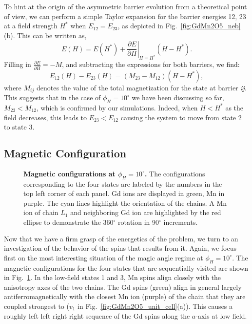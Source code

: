 \\\\
%
To hint at the origin of the asymmetric barrier evolution from a theoretical point of view, we can perform a simple Taylor expansion for the barrier energies 12, 23 at a field strength $H^*$ when $E_{12} = E_{23}$, as depicted in Fig.~\ref{fig:GdMn2O5_neb}(b).
This can be written as,
\begin{equation}
	E(H) = E(H^*) + \left.\frac{\partial E}{\partial H}\right|_{H=H^*}(H - H^*).
\end{equation}
Filling in $\frac{\partial E}{\partial H} = -M$, and subtracting the expressions for both barriers, we find:
\begin{equation}
	E_{12}(H) - E_{23}(H) = (M_{23} - M_{12})(H - H^*),
\end{equation}
where $M_{ij}$ denotes the value of the total magnetization for the state at barrier {\it ij}.
This suggests that in the case of $\phi_H=10^\circ$ we have been discussing so far, $M_{23} < M_{12}$, which is confirmed by our simulations.
Indeed, when $H<H^*$ as the field decreases, this leads to $E_{23} < E_{12}$ causing the system to move from state 2 to state 3.

\subsection{Magnetic Configuration}
\begin{figure}[h!]
    \centering
    \caption{\label{fig:GdMn2O5_spin_configs}{\bf Magnetic configurations at $\phi_H =  10^\circ$.} The configurations corresponding to the four states are labeled by the numbers in the top left corner of each panel. Gd ions are displayed in green, Mn in purple. The cyan lines highlight the orientation of the chains. A Mn ion of chain $L_1$ and neighboring Gd ion are highlighted by the red ellipse to demonstrate the 360$^\circ$ rotation in 90$^\circ$ increments.  }
    \label{fig:GdMn2O5_4configs}
\end{figure}
Now that we have a firm grasp of the energetics of the problem, we turn to an investigation of the behavior of the spins that results from it.
Again, we focus first on the most interesting situation of the magic angle regime at $\phi_H=10^\circ$.
The magnetic configurations for the four states that are sequentially visited are shown in Fig.~\ref{fig:GdMn2O5_4configs}.
In the low-field states 1 and 3, Mn spins align closely with the anisotropy axes of the two chains.
The Gd spins (green) align in general largely antiferromagnetically with the closest Mn ion (purple) of the chain that they are coupled strongest to ($v_1$ in Fig.~\ref{fig:GdMn2O5_unit_cell}(a)).
This causes a roughly left left right right sequence of the Gd spins along the $a$-axis at low field. 

